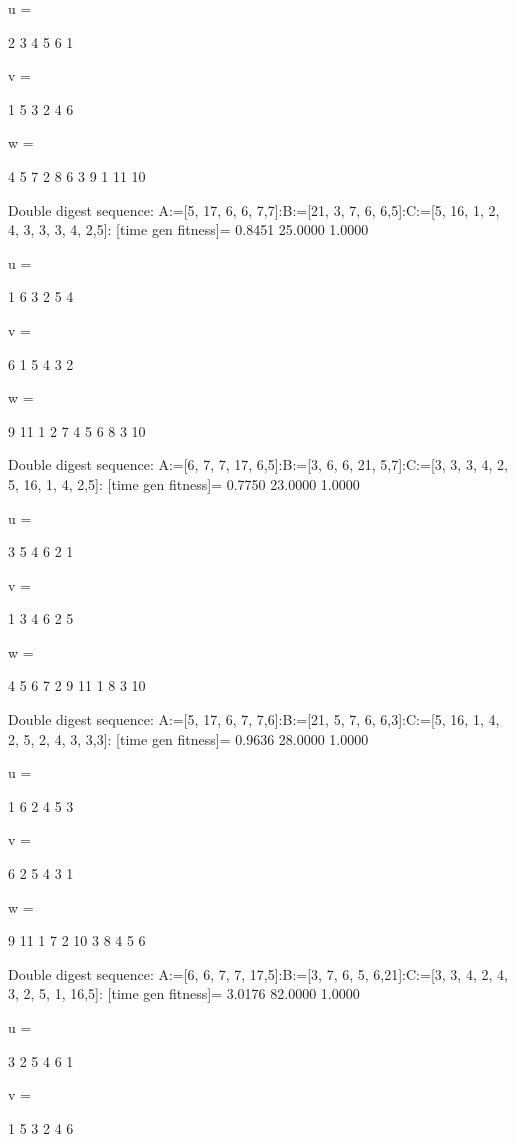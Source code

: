 u =

     2     3     4     5     6     1


v =

     1     5     3     2     4     6


w =

     4     5     7     2     8     6     3     9     1    11    10

Double digest sequence:
A:=[5, 17, 6, 6, 7,7]:B:=[21, 3, 7, 6, 6,5]:C:=[5, 16, 1, 2, 4, 3, 3, 3, 4, 2,5]:
[time gen fitness]=
    0.8451   25.0000    1.0000


u =

     1     6     3     2     5     4


v =

     6     1     5     4     3     2


w =

     9    11     1     2     7     4     5     6     8     3    10

Double digest sequence:
A:=[6, 7, 7, 17, 6,5]:B:=[3, 6, 6, 21, 5,7]:C:=[3, 3, 3, 4, 2, 5, 16, 1, 4, 2,5]:
[time gen fitness]=
    0.7750   23.0000    1.0000


u =

     3     5     4     6     2     1


v =

     1     3     4     6     2     5


w =

     4     5     6     7     2     9    11     1     8     3    10

Double digest sequence:
A:=[5, 17, 6, 7, 7,6]:B:=[21, 5, 7, 6, 6,3]:C:=[5, 16, 1, 4, 2, 5, 2, 4, 3, 3,3]:
[time gen fitness]=
    0.9636   28.0000    1.0000


u =

     1     6     2     4     5     3


v =

     6     2     5     4     3     1


w =

     9    11     1     7     2    10     3     8     4     5     6

Double digest sequence:
A:=[6, 6, 7, 7, 17,5]:B:=[3, 7, 6, 5, 6,21]:C:=[3, 3, 4, 2, 4, 3, 2, 5, 1, 16,5]:
[time gen fitness]=
    3.0176   82.0000    1.0000


u =

     3     2     5     4     6     1


v =

     1     5     3     2     4     6


